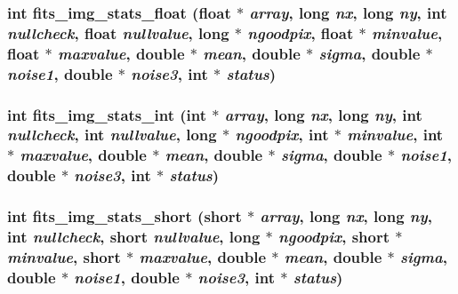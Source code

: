 \subsubsection{\setlength{\rightskip}{0pt plus 5cm}int fits\_\-img\_\-stats\_\-float (float $\ast$ {\em array}, long {\em nx}, long {\em ny}, int {\em nullcheck}, float {\em nullvalue}, long $\ast$ {\em ngoodpix}, float $\ast$ {\em minvalue}, float $\ast$ {\em maxvalue}, double $\ast$ {\em mean}, double $\ast$ {\em sigma}, double $\ast$ {\em noise1}, double $\ast$ {\em noise3}, int $\ast$ {\em status})}\label{test_2shm__client_2fitsio_8h_c543649b7428ec8840c8a9c6beac2cc9}


\subsubsection{\setlength{\rightskip}{0pt plus 5cm}int fits\_\-img\_\-stats\_\-int (int $\ast$ {\em array}, long {\em nx}, long {\em ny}, int {\em nullcheck}, int {\em nullvalue}, long $\ast$ {\em ngoodpix}, int $\ast$ {\em minvalue}, int $\ast$ {\em maxvalue}, double $\ast$ {\em mean}, double $\ast$ {\em sigma}, double $\ast$ {\em noise1}, double $\ast$ {\em noise3}, int $\ast$ {\em status})}\label{test_2shm__client_2fitsio_8h_75b334b5d2e8e4f22b80233208f8aaea}


\subsubsection{\setlength{\rightskip}{0pt plus 5cm}int fits\_\-img\_\-stats\_\-short (short $\ast$ {\em array}, long {\em nx}, long {\em ny}, int {\em nullcheck}, short {\em nullvalue}, long $\ast$ {\em ngoodpix}, short $\ast$ {\em minvalue}, short $\ast$ {\em maxvalue}, double $\ast$ {\em mean}, double $\ast$ {\em sigma}, double $\ast$ {\em noise1}, double $\ast$ {\em noise3}, int $\ast$ {\em status})}\label{test_2shm__client_2fitsio_8h_44abb1fc831a924cc5d60ebff4918525}


